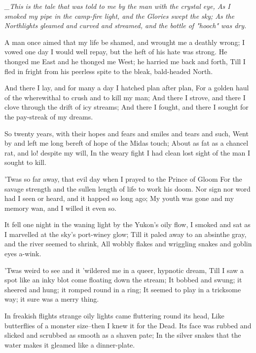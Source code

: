 
\begin{poemblock}
\textit{
  _This is the tale that was told to me by the man with the crystal eye,
  As I smoked my pipe in the camp-fire light,
and the Glories swept the sky;
  As the Northlights gleamed and curved and streamed,
and the bottle of "hooch" was dry.
}

 A man once aimed that my life be shamed, and wrought me a deathly wrong;
 I vowed one day I would well repay, but the heft of his hate was strong.
 He thonged me East and he thonged me West; he harried me back and forth,
 Till I fled in fright from his peerless spite
   to the bleak, bald-headed North.

 And there I lay, and for many a day I hatched plan after plan,
 For a golden haul of the wherewithal to crush and to kill my man;
 And there I strove, and there I clove through the drift of icy streams;
 And there I fought, and there I sought for the pay-streak of my dreams.

 So twenty years, with their hopes and fears and smiles and tears and such,
 Went by and left me long bereft of hope of the Midas touch;
 About as fat as a chancel rat, and lo! despite my will,
 In the weary fight I had clean lost sight of the man I sought to kill.

 'Twas so far away, that evil day when I prayed to the Prince of Gloom
 For the savage strength and the sullen length of life to work his doom.
 Nor sign nor word had I seen or heard, and it happed so long ago;
 My youth was gone and my memory wan, and I willed it even so.

 It fell one night in the waning light by the Yukon's oily flow,
 I smoked and sat as I marvelled at the sky's port-winey glow;
 Till it paled away to an absinthe gray, and the river seemed to shrink,
 All wobbly flakes and wriggling snakes and goblin eyes a-wink.

 'Twas weird to see and it 'wildered me in a queer, hypnotic dream,
 Till I saw a spot like an inky blot come floating down the stream;
 It bobbed and swung; it sheered and hung; it romped round in a ring;
 It seemed to play in a tricksome way; it sure was a merry thing.

 In freakish flights strange oily lights came fluttering round its head,
 Like butterflies of a monster size--then I knew it for the Dead.
 Its face was rubbed and slicked and scrubbed as smooth as a shaven pate;
 In the silver snakes that the water makes it gleamed like a dinner-plate.


\end{poemblock}
